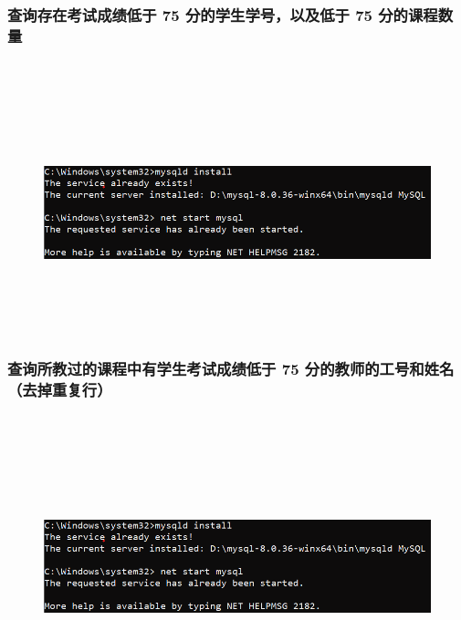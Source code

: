 \documentclass{ctexart}
\begin{document}
\subsubsection{查询存在考试成绩低于 75 分的学生学号，以及低于 75 分的课程数量}
\begin{lstlisting}[language=sql]
	
\end{lstlisting}
\begin{figure}[H]
	\centering 
	\includegraphics[height=7cm,width=14cm]{1.png}
	\end{figure}
\subsubsection{查询所教过的课程中有学生考试成绩低于 75 分的教师的工号和姓名（去掉重复行）}
\begin{lstlisting}[language=sql]
	
\end{lstlisting}
\begin{figure}[H]
	\centering 
	\includegraphics[height=7cm,width=14cm]{1.png}
	\end{figure}
\end{document}
